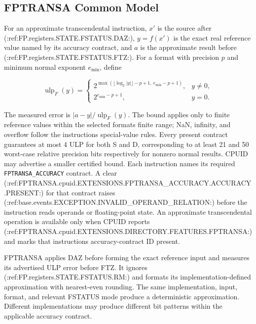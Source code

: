 \subsection{FPTRANSA Common Model}\label{section:fptransa-common-model}
For an approximate transcendental instruction, $x'$ is the source after (:ref:FP.registers.STATE.FSTATUS.DAZ:), $y=f(x')$ is the
exact real reference value named by its accuracy contract, and $a$ is the approximate result before
(:ref:FP.registers.STATE.FSTATUS.FTZ:). For a format with precision $p$ and minimum normal exponent $e_{\min}$, define

\[
  \operatorname{ulp}_F(y) =
  \begin{cases}
    2^{\max(\lfloor\log_2 |y|\rfloor-p+1,\ e_{\min}-p+1)}, & y\ne0,\\
    2^{e_{\min}-p+1}, & y=0.
  \end{cases}
\]

The measured error is $|a-y|/\operatorname{ulp}_F(y)$. The bound applies only to finite reference values within
the selected format\textquotesingle{}s finite range; NaN, infinity, and overflow follow the instruction\textquotesingle{}s special-value rules.
Every present contract guarantees at most 4 ULP for both S and D, corresponding to at least 21 and 50 worst-case
relative precision bits respectively for nonzero normal results. CPUID may advertise a smaller certified bound.
Each instruction names its required \texttt{FPTRANSA\_ACCURACY} contract. A clear (:ref:FPTRANSA.cpuid.EXTENSIONS.FPTRANSA_ACCURACY.ACCURACY.PRESENT:) for that
contract raises (:ref:base.events.EXCEPTION.INVALID_OPERAND_RELATION:) before the instruction reads operands or floating-point state.
An approximate transcendental operation is available only when CPUID reports (:ref:FPTRANSA.cpuid.EXTENSIONS.DIRECTORY.FEATURES.FPTRANSA:) and marks that
instruction\textquotesingle{}s accuracy-contract ID present.

FPTRANSA applies DAZ before forming the exact reference input and measures its advertised ULP error before FTZ.
It ignores (:ref:FP.registers.STATE.FSTATUS.RM:) and formats its implementation-defined approximation with nearest-even rounding.
The same implementation, input, format, and relevant FSTATUS mode produce a deterministic approximation.
Different implementations may produce different bit patterns within the applicable accuracy contract.

